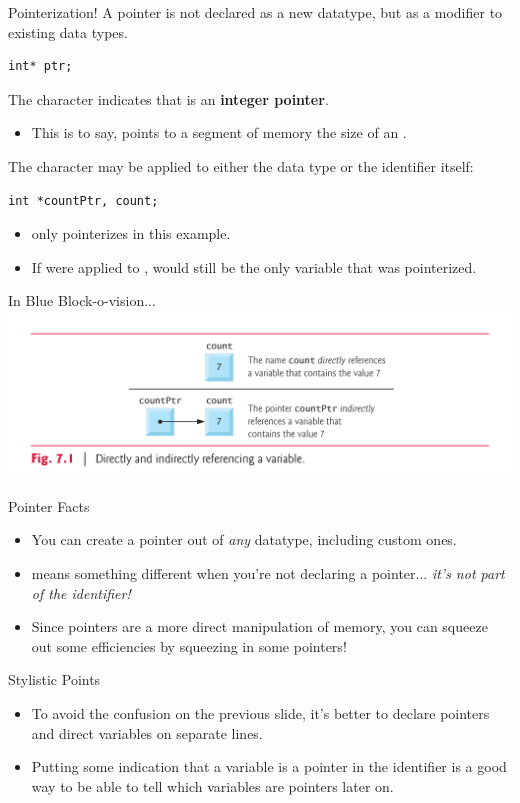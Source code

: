 \documentclass[11pt]{beamer}
\let\OldTexttt\texttt
\renewcommand{\texttt}[1]{\OldTexttt{\color{teal}{#1}}}
\begin{document}
\begin{frame}[fragile=singleslide]{Pointerization!}
A pointer is not declared as a new datatype, but as a modifier to existing data types.
\begin{lstlisting}[style = C]
int* ptr;
\end{lstlisting}
The \texttt{*} character indicates that \texttt{ptr} is an \textbf{integer pointer}.  
\begin{itemize}
\item This is to say, \texttt{ptr} points to a segment of memory the size of an \texttt{int}.  
\end{itemize}
The \texttt{*} character may be applied to either the data type or the identifier itself:
\begin{lstlisting}[style = C]
int *countPtr, count;
\end{lstlisting}
\begin{itemize}
\item \texttt{*} only pointerizes \texttt{countPtr} in this example.  
\item If \texttt{*} were applied to \texttt{int}, \texttt{countPtr} would still be the only variable that was pointerized.
\end{itemize}
\end{frame}

\begin{frame}{In Blue Block-o-vision...}
\center
\includegraphics[scale=0.125]{tba.png}
\end{frame}

\begin{frame}{Pointer Facts}
\begin{itemize}
\item You can create a pointer out of \emph{any} datatype, including custom ones.
\item \texttt{*} means something different when you're not declaring a pointer... \emph{it's not part of the identifier!}
\item Since pointers are a more direct manipulation of memory, you can squeeze out some efficiencies by squeezing in some pointers! 
\end{itemize}
Stylistic Points
\begin{itemize}
\item To avoid the confusion on the previous slide, it's better to declare pointers and direct variables on separate lines.
\item Putting some indication that a variable is a pointer in the identifier is a good way to be able to tell which variables are pointers later on.  
\end{itemize}
\end{frame}
\end{document}
